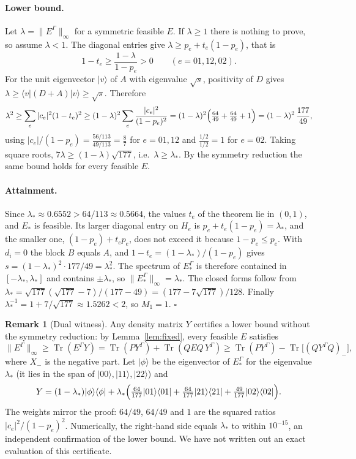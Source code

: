 \documentclass[11pt,a4paper]{article}
\theoremstyle{definition}
\newtheorem{remark}[theorem]{Remark}
\theoremstyle{plain}
\DeclareMathOperator{\Tr}{Tr}
\newcommand{\ket}[1]{\lvert#1\rangle}
\newcommand{\bra}[1]{\langle#1\rvert}
\newcommand{\norm}[1]{\lVert#1\rVert}
\begin{document}
\paragraph{Lower bound.}
Let $\lambda=\norm{E^\Gamma}_\infty$ for a symmetric feasible $E$. If
$\lambda\ge1$ there is nothing to prove, so assume $\lambda<1$. The diagonal
entries give $\lambda\ge p_e+t_e(1-p_e)$, that is
\[
1-t_e\ge\frac{1-\lambda}{1-p_e}>0\qquad(e=01,12,02).
\]
For the unit eigenvector $\ket v$ of $A$ with eigenvalue $\sqrt s$, positivity
of $D$ gives $\lambda\ge\bra v(D+A)\ket v\ge\sqrt s$. Therefore
\[
\lambda^2\ge\sum_e|c_e|^2(1-t_e)^2\ge(1-\lambda)^2\sum_e\frac{|c_e|^2}{(1-p_e)^2}
=(1-\lambda)^2\Bigl(\tfrac{64}{49}+\tfrac{64}{49}+1\Bigr)
=(1-\lambda)^2\,\frac{177}{49},
\]
using $|c_e|/(1-p_e)=\frac{56/113}{49/113}=\frac87$ for $e=01,12$ and
$\frac{1/2}{1/2}=1$ for $e=02$. Taking square roots,
$7\lambda\ge(1-\lambda)\sqrt{177}$, i.e.\ $\lambda\ge\lambda_*$. By the
symmetry reduction the same bound holds for every feasible $E$.

\paragraph{Attainment.}
Since $\lambda_*\approx0.6552>64/113\approx0.5664$, the values $t_e$ of the
theorem lie in $(0,1)$, and $E_*$ is feasible. Its larger diagonal entry on
$H_e$ is $p_e+t_e(1-p_e)=\lambda_*$, and the smaller one,
$(1-p_e)+t_ep_e$, does not exceed it because $1-p_e\le p_e$. With
$d_i=0$ the block $B$ equals $A$, and $1-t_e=(1-\lambda_*)/(1-p_e)$ gives
$s=(1-\lambda_*)^2\cdot177/49=\lambda_*^2$. The spectrum of $E_*^\Gamma$ is
therefore contained in $[-\lambda_*,\lambda_*]$ and contains $\pm\lambda_*$,
so $\norm{E_*^\Gamma}_\infty=\lambda_*$. The closed forms follow from
$\lambda_*=\sqrt{177}(\sqrt{177}-7)/(177-49)=(177-7\sqrt{177})/128$.
Finally $\lambda_*^{-1}=1+7/\sqrt{177}\approx1.5262<2$, so $M_1=1$.
\hfill$\square$

\begin{remark}[Dual witness]\label{rem:dual}
Any density matrix $Y$ certifies a lower bound without the symmetry
reduction: by Lemma~\ref{lem:fixed}, every feasible $E$ satisfies
\[
\norm{E^\Gamma}_\infty\ge\Tr(E^\Gamma Y)=\Tr(PY^\Gamma)+\Tr(QEQ\,Y^\Gamma)
\ge\Tr(PY^\Gamma)-\Tr\bigl[(QY^\Gamma Q)_-\bigr],
\]
where $X_-$ is the negative part. Let $\ket\phi$ be the eigenvector of
$E_*^\Gamma$ for the eigenvalue $\lambda_*$ (it lies in the span of
$\ket{00},\ket{11},\ket{22}$) and
\[
Y=(1-\lambda_*)\ket\phi\bra\phi+\lambda_*\Bigl(\tfrac{64}{177}\ket{01}\bra{01}
+\tfrac{64}{177}\ket{21}\bra{21}+\tfrac{49}{177}\ket{02}\bra{02}\Bigr).
\]
The weights mirror the proof: $64/49$, $64/49$ and $1$ are the squared ratios
$|c_e|^2/(1-p_e)^2$. Numerically, the right-hand side equals $\lambda_*$ to
within $10^{-15}$, an independent confirmation of the lower bound. We have not
written out an exact evaluation of this certificate.
\end{remark}
\end{document}
